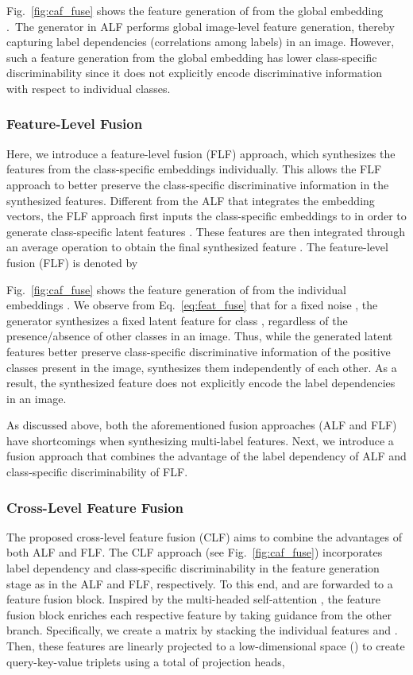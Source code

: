 \documentclass[final]{cvpr}
\begin{document}
Fig.~\ref{fig:caf_fuse} shows the feature generation of  from the global embedding .~The generator  in ALF performs global image-level feature generation, thereby capturing label dependencies (correlations among labels) in an image. However, such a feature generation from the global embedding  has lower class-specific discriminability since it does not explicitly encode discriminative information with respect to individual classes. 

\subsubsection{Feature-Level Fusion}\label{sec:feat_fuse}
Here, we introduce a feature-level fusion (FLF) approach,
which synthesizes the features from the class-specific embeddings individually.
This allows the FLF approach to better preserve the class-specific discriminative information in the synthesized features.
Different from the ALF that integrates the embedding vectors, the FLF approach first inputs the  class-specific embeddings  to  in order to generate  class-specific latent features . These features are then integrated through an average operation to obtain the final synthesized feature . The feature-level fusion (FLF) is denoted by

Fig.~\ref{fig:caf_fuse} shows the feature generation of  from the individual embeddings . We observe from Eq.~\ref{eq:feat_fuse} that for a fixed noise , the generator  synthesizes a fixed latent feature  for class , regardless of the presence/absence of other classes in an image.
Thus, while the generated latent features  better preserve class-specific discriminative information of the positive classes  present in the image,   synthesizes them independently of each other.
As a result, the synthesized feature  does not explicitly encode the label dependencies in an image. 

As discussed above, both the aforementioned fusion approaches (ALF and FLF) have shortcomings when synthesizing multi-label features. Next, we introduce a fusion approach that combines the advantage of the label dependency of ALF and class-specific discriminability of FLF. 

\subsubsection{Cross-Level Feature Fusion}
\label{sec:cross_fuse}
The proposed cross-level feature fusion (CLF) aims to combine the advantages of both ALF and FLF. The CLF approach (see Fig.~\ref{fig:caf_fuse}) incorporates label dependency and class-specific discriminability in the feature generation stage as in the ALF and FLF, respectively. To this end,  and  are forwarded to a feature fusion block. Inspired by the multi-headed self-attention \cite{vaswani2017attention}, the feature fusion block enriches each respective feature by taking guidance from the other branch. Specifically, we create a matrix  by stacking the individual features  and . Then,  these features are linearly projected to a low-dimensional space () to create query-key-value triplets using a total of  projection heads,
\end{document}
